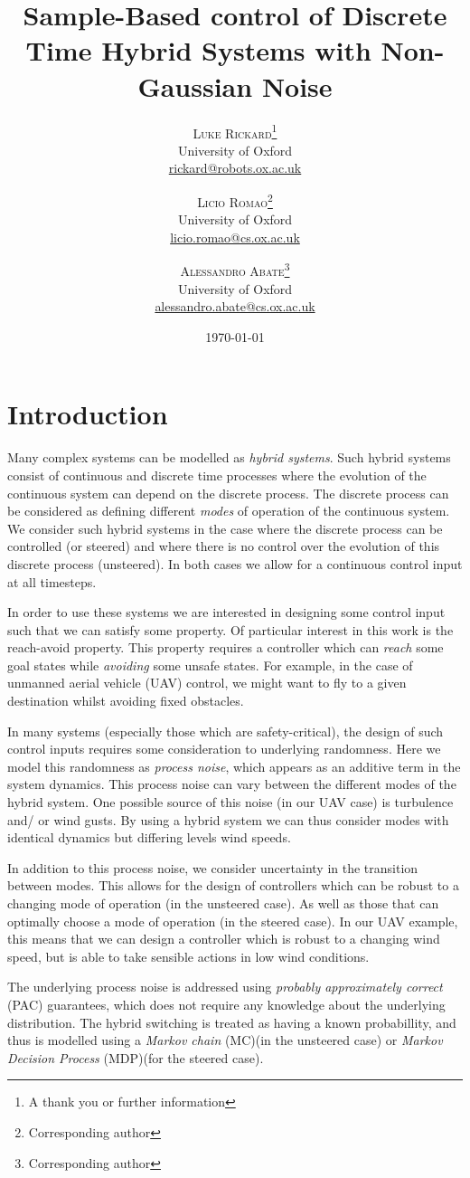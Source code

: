 \documentclass[twoside,twocolumn]{article}
\title{Sample-Based control of Discrete Time Hybrid Systems with Non-Gaussian Noise} %
\author{%
\textsc{Luke Rickard}\thanks{A thank you or further information} \\[1ex] %
\normalsize University of Oxford \\ %
\normalsize \href{mailto:rickard@robots.ox.ac.uk}{rickard@robots.ox.ac.uk} %
\and %
\textsc{Licio Romao}\thanks{Corresponding author} \\[1ex] %
\normalsize University of Oxford \\ %
\normalsize \href{mailto:licio.romao@cs.ox.ac.uk}{licio.romao@cs.ox.ac.uk} %
\and %
\textsc{Alessandro Abate}\thanks{Corresponding author} \\[1ex] %
\normalsize University of Oxford \\ %
\normalsize \href{mailto:alessandro.abate@cs.ox.ac.uk}{alessandro.abate@cs.ox.ac.uk} %
}
\date{\today} %
\begin{document}
\maketitle

\section{Introduction}
Many complex systems can be modelled as \emph{hybrid systems}. Such hybrid systems consist of continuous and discrete time processes where the evolution of the continuous system can depend on the discrete process. The discrete process can be considered as defining different \emph{modes} of operation of the continuous system. We consider such hybrid systems in the case where the discrete process can be controlled (or steered) and where there is no control over the evolution of this discrete process (unsteered). In both cases we allow for a continuous control input at all timesteps.

In order to use these systems we are interested in designing some control input such that we can satisfy some property. Of particular interest in this work is the reach-avoid property. This property requires a controller which can \emph{reach} some goal states while \emph{avoiding} some unsafe states. For example, in the case of unmanned aerial vehicle (UAV) control, we might want to fly to a given destination whilst avoiding fixed obstacles.

In many systems (especially those which are safety-critical), the design of such control inputs requires some consideration to underlying randomness. Here we model this randomness as \emph{process noise}, which appears as an additive term in the system dynamics. This process noise can vary between the different modes of the hybrid system. One possible source of this noise (in our UAV case) is turbulence and/ or wind gusts. By using a hybrid system we can thus consider modes with identical dynamics but differing levels wind speeds.

In addition to this process noise, we consider uncertainty in the transition between modes. This allows for the design of controllers which can be robust to a changing mode of operation (in the unsteered case). As well as those that can optimally choose a mode of operation (in the steered case). In our UAV example, this means that we can design a controller which is robust to a changing wind speed, but is able to take sensible actions in low wind conditions.

The underlying process noise is addressed using \emph{probably approximately correct} (PAC) guarantees, which does not require any knowledge about the underlying distribution.
The hybrid switching is treated as having a known probabillity, and thus is modelled using a \emph{Markov chain} (MC)(in the unsteered case) or \emph{Markov Decision Process} (MDP)(for the steered case).
\end{document}
